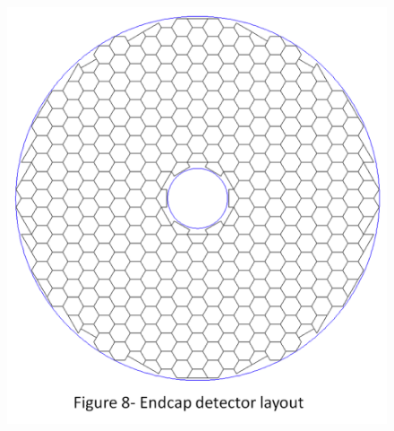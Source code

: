 \begin{figure}
\includegraphics[width=.5\linewidth]{Calorimeter/SiliconTungstenSiD/endcapLayout}
\end{figure}

